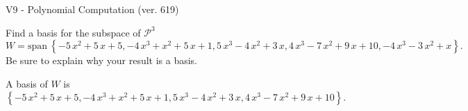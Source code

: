 \begin{exercise}
  \begin{exerciseTitle}V9 - Polynomial Computation (ver. 619)\end{exerciseTitle}
  \begin{exerciseStatement}
    Find a basis for the subspace of \(\mathcal{P}^3\) 
\[W=\mathrm{span}\ \left\{-5 \, x^{2} + 5 \, x + 5 , -4 \, x^{3} + x^{2} + 5 \, x + 1 , 5 \, x^{3} - 4 \, x^{2} + 3 \, x , 4 \, x^{3} - 7 \, x^{2} + 9 \, x + 10 , -4 \, x^{3} - 3 \, x^{2} + x\right\}.\]
 Be sure to explain why your result is a basis.


  \end{exerciseStatement}
  \begin{exerciseAnswer}
   A basis of \(W\) is  \(\left\{-5 \, x^{2} + 5 \, x + 5 , -4 \, x^{3} + x^{2} + 5 \, x + 1 , 5 \, x^{3} - 4 \, x^{2} + 3 \, x , 4 \, x^{3} - 7 \, x^{2} + 9 \, x + 10\right\}\).
  


  \end{exerciseAnswer}
\end{exercise}